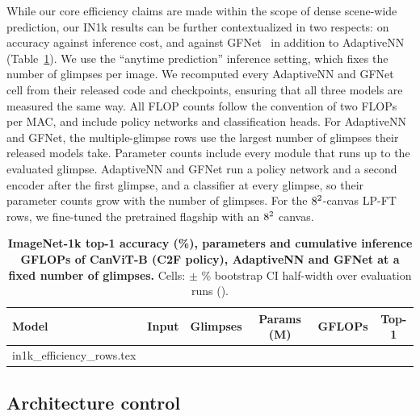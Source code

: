 \documentclass{article}
\makeatletter
\newcommand{\inputrows}[1]{\@@input #1 }
\makeatother
\begin{document}
While our core efficiency claims are made within the scope of dense scene-wide prediction, our IN1k results can be further contextualized in two respects: on accuracy against inference cost, and against GFNet~\cite{wangGlanceFocusDynamic2020} in addition to AdaptiveNN~\cite{wangEmulatingHumanlikeAdaptive2025} (Table~\ref{tab:in1k-efficiency}).
We use the ``anytime prediction'' inference setting, which fixes the number of glimpses per image.
We recomputed every AdaptiveNN and GFNet cell from their released code and checkpoints, ensuring that all three models are measured the same way.
All FLOP counts follow the convention of two FLOPs per MAC, and include policy networks and classification heads.
For AdaptiveNN and GFNet, the multiple-glimpse rows use the largest number of glimpses their released models take.
Parameter counts include every module that runs up to the evaluated glimpse.
AdaptiveNN and GFNet run a policy network and a second encoder after the first glimpse, and a classifier at every glimpse, so their parameter counts grow with the number of glimpses.
For the $8^2$-canvas LP-FT rows, we fine-tuned the pretrained flagship with an $8^2$ canvas.

\begin{table}[h]
  \caption{\textbf{ImageNet-1k top-1 accuracy (\%), parameters and cumulative inference GFLOPs of CanViT-B (C2F policy), AdaptiveNN and GFNet at a fixed number of glimpses.}
  Cells: $\pm$ \bootstrapCiPct\% bootstrap CI half-width over evaluation runs (\inkEffRuns).}
  \label{tab:in1k-efficiency}
  \centering
  \small
  \begin{tabular}{lccccc}
    \toprule
    \textbf{Model} & \textbf{Input} & \textbf{Glimpses} & \textbf{Params (M)} & \textbf{GFLOPs} & \textbf{Top-1} \\
    \midrule
    \inputrows{in1k_efficiency_rows.tex}
    \bottomrule
  \end{tabular}
\end{table}

\FloatBarrier
\subsection{Architecture control}
\label{supp:architecture-control}
\end{document}
